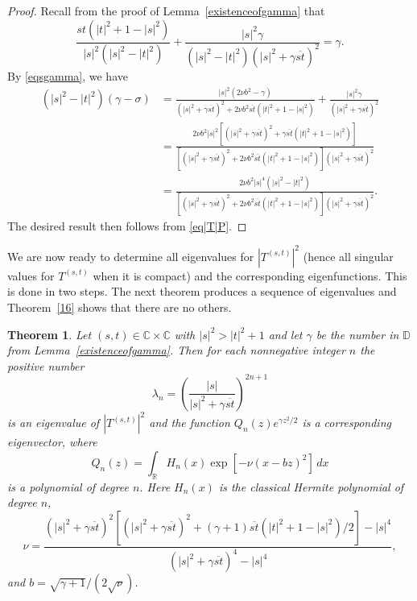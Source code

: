\documentclass[reqno]{amsart}
\newtheorem{theorem}{Theorem}%
\newcommand{\R}{{\mathbb R}}
\newcommand{\C}{{\mathbb C}}
\newcommand{\D}{{\mathbb D}}
\newcommand{\inr}{\int_{\R}}
\begin{document}
\begin{proof}
Recall from the proof of Lemma~\ref{existenceofgamma} that
$$\frac{st(|t|^2+1-|s|^2)}{|s|^2(|s|^2-|t|^2)}
 +\frac{|s|^2 \gamma }{(|s|^2-|t|^2)\left(|s|^2+
 \gamma{\overline{st}}\right)^2}={\gamma}.$$
By \eqref{eqsgamma}, we have
\begin{align*}
(|s|^2-|t|^2)(\gamma-\sigma)&=\frac{|s|^2(2\nu b^2-\gamma)}{(|s|^2+\gamma{\overline{st}})^2+2\nu b^2{\overline{st}}(|t|^2+1-|s|^2)}+\frac{|s|^2 \gamma }{(|s|^2+\gamma{\overline{st}})^2}\\
&=\frac{2\nu b^2|s|^2\left[(|s|^2+\gamma{\overline{st}})^2+
\gamma{\overline{st}}(|t|^2+1-|s|^2)\right] }{\left[(|s|^2+
\gamma{\overline{st}})^2+2\nu b^2{\overline{st}}(|t|^2+1-|s|^2)
\right](|s|^2+\gamma{\overline{st}})^2}\\[8pt]
&=\frac{2\nu b^2|s|^4(|s|^2-|t|^2) }{\left[(|s|^2+
\gamma{\overline{st}})^2+2\nu b^2{\overline{st}}
(|t|^2+1-|s|^2)\right](|s|^2+\gamma{\overline{st}})^2}.
\end{align*}
The desired result then follows from \eqref{eq|T|P}.
\end{proof}

We are now ready to determine all eigenvalues for
$\left|T^{(s,t)}\right|^2$ (hence all singular values for
$T^{(s,t)}$ when it is compact) and the corresponding eigenfunctions.
This is done in two steps. The next theorem produces a sequence of
eigenvalues and Theorem~\ref{16} shows that there are no others.

\begin{theorem}\label{thm|T|2}
Let $(s, t)\in\C\times\C$ with $|s|^2>|t|^2+1$ and let $\gamma$ be the
number in $\D$ from Lemma~\ref{existenceofgamma}. Then for each
nonnegative integer $n$ the positive number
$$\lambda_n=\left(\frac{|s|}{|s|^2+
\gamma{\overline{st}}}\right)^{2n+1}$$
is an eigenvalue of $\left|T^{(s,t)}\right|^2$ and the function
$Q_n(z) e^{\gamma z^2/2}$ is a corresponding eigenvector, where
$$Q_n(z)=\inr  H_n(x)\exp\left[-\nu\left(x-bz\right)^2\right]\,dx$$
is a polynomial of degree $n$. Here $H_n(x)$ is the classical Hermite
polynomial of degree $n$,
$$\nu=\frac {(|s|^2+\gamma{\overline{st}})^{2}\left[(|s|^2
+\gamma{\overline{st}})^2+(\gamma+1){\overline{st}}
(|t|^2+1-|s|^2)/2\right]-|s|^4}{(|s|^2+
\gamma{\overline{st}})^{4}-|s|^4},$$
and $b=\sqrt{\gamma+1}/(2 \sqrt{\nu})$.
\end{theorem}
\end{document}
